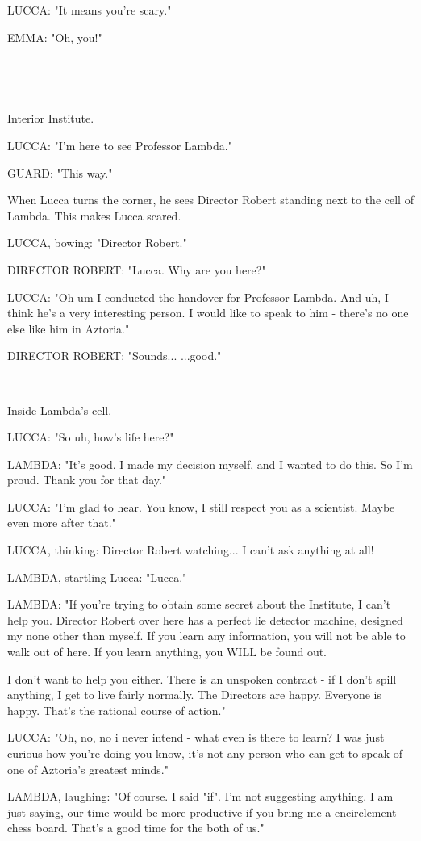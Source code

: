 \documentclass[11pt]{article}
\begin{document}
LUCCA: "It means you're scary."

EMMA: "Oh, you!"

\ 

\ 

Interior Institute.

LUCCA: "I'm here to see Professor Lambda."

GUARD: "This way."

When Lucca turns the corner, he sees Director Robert standing next to the cell of Lambda.
This makes Lucca scared.

LUCCA, bowing: "Director Robert."

DIRECTOR ROBERT: "Lucca. Why are you here?"

LUCCA: "Oh um I conducted the handover for Professor Lambda.
And uh, I think he's a very interesting person. 
I would like to speak to him - there's no one else like him in Aztoria."

DIRECTOR ROBERT: "Sounds...
...good."

\ 

Inside Lambda's cell.

LUCCA: "So uh, how's life here?"

LAMBDA: "It's good.
I made my decision myself, and I wanted to do this.
So I'm proud. 
Thank you for that day."

LUCCA: "I'm glad to hear. You know, I still respect you as a scientist. Maybe even more after that."

LUCCA, thinking: Director Robert watching... I can't ask anything at all!

LAMBDA, startling Lucca: "Lucca."

LAMBDA: "If you're trying to obtain some secret about the Institute, I can't help you. 
Director Robert over here has a perfect lie detector machine, designed my none other than myself.
If you learn any information, you will not be able to walk out of here.
If you learn anything, you WILL be found out.

I don't want to help you either. 
There is an unspoken contract - if I don't spill anything, I get to live fairly normally.
The Directors are happy.
Everyone is happy.
That's the rational course of action."

LUCCA: "Oh, no, no i never intend - what even is there to learn?
I was just curious how you're doing you know, it's not any person who can get to speak of one of Aztoria's greatest minds."

LAMBDA, laughing: "Of course. I said "if". 
I'm not suggesting anything.
I am just saying, our time would be more productive if you bring me a encirclement-chess board. 
That's a good time for the both of us."
\end{document}
